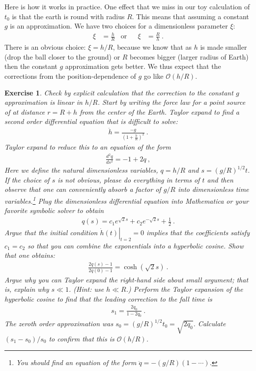 \documentclass[
  11pt,
	colorful,
	raggedright,
]{tufte-style-thesis-flip}
\newtheorem{exercise}{Exercise}[section]
\begin{document}
Here is how it works in practice. One effect that we miss in our toy calculation of $t_0$ is that the earth is round with radius $R$. This means that assuming a constant $g$ is an approximation. We have two choices for a dimensionless parameter $\xi$:
\begin{align}
  \xi &= \frac{h}{R}
  &\text{or}&&
  \xi &= \frac{R}{h} \ .
\end{align}
There is an obvious choice: $\xi = h/R$, because we know that as $h$ is made smaller (drop the ball closer to the ground) or $R$ becomes bigger (larger radius of Earth) then the constant $g$ approximation gets better. We thus expect that the corrections from the position-dependence of $g$ go like $\mathcal O(h/R)$.
 
\begin{exercise}
Check by explicit calculation that the correction to the constant $g$ approximation is linear in $h/R$. Start by writing the force law for a point source of at distance $r=R+h$ from the center of the Earth. Taylor expand to find a second order differential equation that is difficult to solve:
\begin{align} 
  \ddot{h} = \frac{-g}{\left(1+\frac{h}{R}\right)^2} \ .
\end{align}
Taylor expand to reduce this to an equation of the form
\begin{align}
  \frac{d^2 q}{ds^2} = -1 + 2q \ ,
\end{align}
Here we define the natural dimensionless variables, $q = h/R$ and $s = \left(g/R\right)^{1/2} t$. If the choice of $s$ is not obvious, please do everything in terms of $t$ and then observe that one can conveniently absorb a factor of $g/R$ into dimensionless time variables.\footnote{You should find an equation of the form $\ddot q = -(g/R)(1-\cdots)$.} Plug the dimensionless differential equation into \emph{Mathematica} or your favorite symbolic solver to obtain 
\begin{align}
  q(s) = c_1 e^{\sqrt{2}s} + c_2 e^{-\sqrt{2} s} + \frac{1}{2} \ .
\end{align}
Argue that the initial condition $\left.\dot h(t)\right|_{t=2} = 0$ implies that the coefficients satisfy $c_1 = c_2$ so that you can combine the exponentials into a hyperbolic cosine. 
Show that one obtains:
\begin{align}
  \frac{2q(s) - 1}{2q(0) -1} = \cosh(\sqrt{2}s) \ .
\end{align}
Argue why you can Taylor expand the right-hand side about small argument; that is, explain why $s \ll 1$. (Hint: use $h\ll R$.) Perform the Taylor expansion of the hyperbolic cosine to find that the leading correction to the fall time is
\begin{align}
  s_1 = \frac{2q_0}{1-2q_0} \ .
\end{align}
The zeroth order approximation was $s_0 = (g/R)^{1/2} t_0 = \sqrt{2q_0}$. Calculate $(s_1 - s_0)/s_0$ to confirm that this is $\mathcal O(h/R)$. 
\end{exercise}
\end{document}
